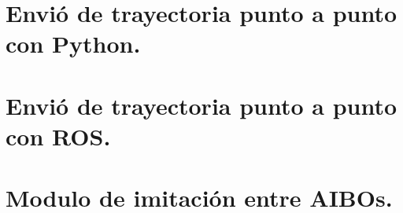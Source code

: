 \documentclass[12pt,a4paper,final,twoside]{book}
\begin{document}
\section{Envió de trayectoria punto a punto con Python.}\label{sinP}


\section{Envió de trayectoria punto a punto con ROS.}\label{sinlegROS}


\section{Modulo de imitación entre AIBOs.}\label{mimiccode}

\end{document}
